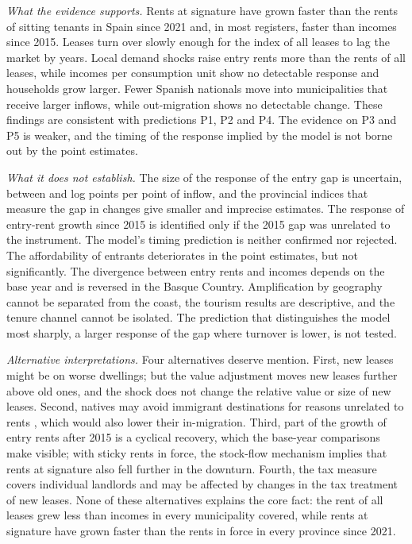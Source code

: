 \documentclass[11pt,a4paper]{article}
\begin{document}
\textit{What the evidence supports.} Rents at signature have grown faster than the rents of sitting tenants in Spain since 2021 and, in most registers, faster than incomes since 2015. Leases turn over slowly enough for the index of all leases to lag the market by years. Local demand shocks raise entry rents more than the rents of all leases, while incomes per consumption unit show no detectable response and households grow larger. Fewer Spanish nationals move into municipalities that receive larger inflows, while out-migration shows no detectable change. These findings are consistent with predictions P1, P2 and P4. The evidence on P3 and P5 is weaker, and the timing of the response implied by the model is not borne out by the point estimates.

\textit{What it does not establish.} The size of the response of the entry gap is uncertain, between \gmmGap{} and \bGap{} log points per point of inflow, and the provincial indices that measure the gap in changes give smaller and imprecise estimates. The response of entry-rent growth since 2015 is identified only if the 2015 gap was unrelated to the instrument. The model's timing prediction is neither confirmed nor rejected. The affordability of entrants deteriorates in the point estimates, but not significantly. The divergence between entry rents and incomes depends on the base year and is reversed in the Basque Country. Amplification by geography cannot be separated from the coast, the tourism results are descriptive, and the tenure channel cannot be isolated. The prediction that distinguishes the model most sharply, a larger response of the gap where turnover is lower, is not tested.

\textit{Alternative interpretations.} Four alternatives deserve mention. First, new leases might be on worse dwellings; but the value adjustment moves new leases further above old ones, and the shock does not change the relative value or size of new leases. Second, natives may avoid immigrant destinations for reasons unrelated to rents \citep{card2001,saiz2011}, which would also lower their in-migration. Third, part of the growth of entry rents after 2015 is a cyclical recovery, which the base-year comparisons make visible; with sticky rents in force, the stock-flow mechanism implies that rents at signature also fell further in the downturn. Fourth, the tax measure covers individual landlords and may be affected by changes in the tax treatment of new leases. None of these alternatives explains the core fact: the rent of all leases grew less than incomes in every municipality covered, while rents at signature have grown faster than the rents in force in every province since 2021.
\end{document}

